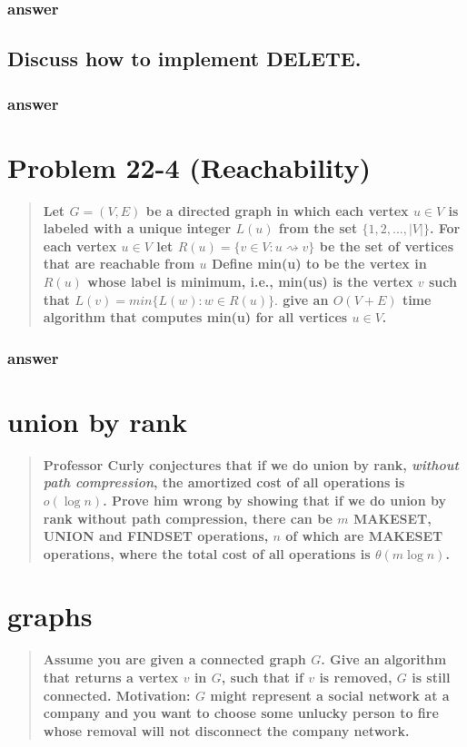 \documentclass[titlepage]{article}\usepackage[]{graphicx}\usepackage[]{color}
\begin{document}
	\subsubsection{answer}






  \subsection{Discuss how to implement DELETE.}
  \subsubsection{answer}

\section{Problem 22-4 (Reachability)}
\begin{quote}
\textbf{ Let $G = (V,E) $ be a directed graph in which each vertex $ u \in V$
  is labeled with a unique integer $L(u) $ from the set $\{1,2,\dots,|V|\}$.
  For each vertex $u \in V$ let $R(u) = \{v \in V : u \rightsquigarrow v\}$ be the set
  of vertices that are reachable from $u$ Define min(u) to be the vertex in
  $R(u)$ whose label is minimum, i.e., min(us) is the vertex $v$ such that
  $L(v) = min\{L(w) : w \in R(u)\}. $ give an $O(V + E)$ time algorithm that
  computes min(u) for all vertices $u \in V$.
}
\end{quote}

\subsubsection{answer}

\section{union by rank}
\begin{quote}
  \textbf{Professor Curly conjectures that if we do union by rank,
\emph{without path compression}, the amortized cost of all operations
is $o(\log n)$.  Prove him wrong by showing that if we do union by
rank without path compression, there can be $m$ MAKESET, UNION and
FINDSET operations, $n$ of which are MAKESET operations, where the
total cost of all operations is $\theta(m \log n)$.}
\end{quote}


\section{graphs}
\begin{quote}
  \textbf{Assume you are given a connected graph $G$.  Give an algorithm
that returns a vertex $v$ in $G$, such that if $v$ is removed, $G$ is
still connected.  Motivation: $G$ might represent a social network at
a company and you want to choose some unlucky person to fire whose
removal will not disconnect the company network.}
\end{quote}
\end{document}
